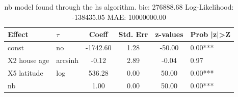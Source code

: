 \begin{table}
	\caption{nb model found through the hs algorithm. bic: 276888.68 Log-Likelihood: -138435.05 MAE: 10000000.00}
	\begin{center}
		\begin{tabular}{|l|l|c|c|c|l|}
			\hline
			Effect & $\tau$ & Coeff & Std. Err & z-values & Prob |z|>Z \\
			\hline
			const & no & -1742.60 & 1.28 & -50.00 & 0.00*** \\
			\hline
			X2 house age & arcsinh & -0.12 & 2.89 & -0.04 & 0.97 \\
			\hline
			X5 latitude & log & 536.28 & 0.00 & 50.00 & 0.00*** \\
			\hline
			nb &  & 1.00 & 0.00 & 50.00 & 0.00*** \\
			\hline
		\end{tabular}
	\end{center}
\end{table}
